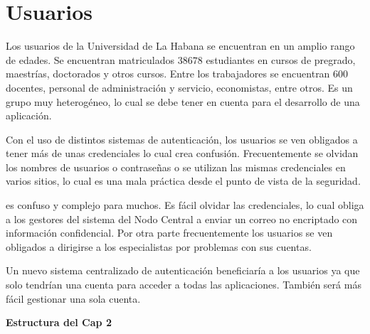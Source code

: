 \section*{Usuarios}

Los usuarios de la Universidad de La Habana se encuentran en un amplio rango de edades. Se encuentran matriculados $38 678$ estudiantes en cursos de pregrado, maestrías, doctorados y otros cursos. Entre los trabajadores se encuentran $600$ docentes, personal de administración y servicio, economistas, entre otros. Es un grupo muy heterogéneo, lo cual se debe tener en cuenta para el desarrollo de una aplicación.

Con el uso de distintos sistemas de autenticación, los usuarios se ven obligados a tener más de unas credenciales lo cual crea confusión. Frecuentemente se olvidan los nombres de usuarios o contraseñas o se utilizan las mismas credenciales en varios sitios, lo cual es una mala práctica desde el punto de vista de la seguridad.


es confuso y complejo para muchos. Es fácil olvidar las credenciales, lo cual obliga a los gestores del sistema del Nodo Central a enviar un correo no encriptado con información confidencial. Por otra parte frecuentemente los usuarios se ven obligados a dirigirse a los especialistas por problemas con sus cuentas. 

Un nuevo sistema centralizado de autenticación beneficiaría a los usuarios ya que solo tendrían una cuenta para acceder a todas las aplicaciones. También será más fácil gestionar una sola cuenta.


\textbf{Estructura del Cap 2}

